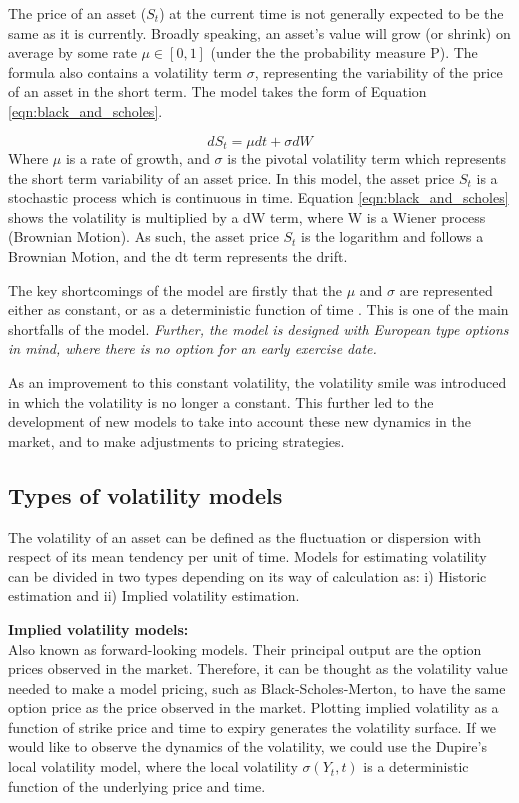 \documentclass[12pt,oneside]{article}
\begin{document}
The price of an asset ($S_t$) at the current time is not generally expected to be the same as it is currently. Broadly speaking, an asset's value will grow (or shrink) on average by some rate $\mu \in [0,1]$ (under the the probability measure \mathbb P). The formula also contains a volatility term $\sigma$, representing the variability of the price of an asset in the short term. The model takes the form of Equation \ref{eqn:black_and_scholes}.

\begin{equation}
\label{eqn:black_and_scholes} 
dS_t=\mu dt + \sigma dW
\end{equation}
Where $\mu$ is a rate of growth, and $\sigma$ is the pivotal volatility term which represents the short term variability of an asset price. In this model, the asset price $S_t$ is a stochastic process which is continuous in time. Equation \ref{eqn:black_and_scholes} shows the volatility is multiplied by a dW term, where W is a Wiener process (Brownian Motion). As such, the asset price $S_t$ is the logarithm and follows a Brownian Motion, and the dt term represents the drift.

The key shortcomings of the model are firstly that the $\mu$ and $\sigma$ are represented either as constant, or as a deterministic function of time \cite{BlackScholesOR, Gatheral2014}. This is one of the main shortfalls of the model. \emph{Further, the model is designed with European type options in mind, where there is no option for an early exercise date.} 

As an improvement to this constant volatility, the volatility smile was introduced in which the volatility is no longer a constant. This further led to the development of new models to take into account these new dynamics in the market, and to make adjustments to pricing strategies.

\subsection{Types of volatility models}

The volatility of an asset can be defined as the fluctuation or dispersion with respect of its mean tendency per unit of time. Models for estimating volatility can be divided in two types depending on its way of calculation as: i) Historic estimation and ii) Implied volatility estimation.

\textbf{Implied volatility models:}
\\

Also known as forward-looking models. Their principal output are the option prices observed in the market. Therefore, it can be thought as the volatility value needed to make a model pricing, such as Black-Scholes-Merton, to have the same option price as the price observed in the market. Plotting implied volatility as a function of strike price and time to expiry generates the volatility surface. If we would like to observe the dynamics of the volatility, we could use the Dupire’s local volatility model, where the local volatility $\sigma(Y_{t}, t)$ is a deterministic function of the underlying price and time.  
\end{document}

